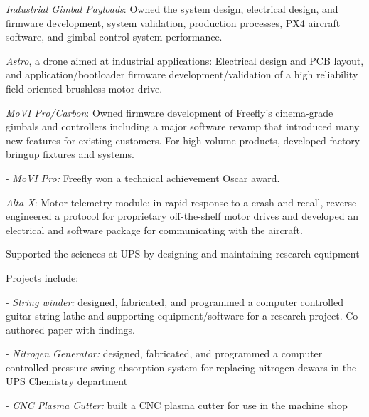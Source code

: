 \documentclass[letterpaper]{deedy-resume} %
\begin{document}
\begin{minipage}[t]{0.66\textwidth}
\begin{tightitemize}
\item \textit{Industrial Gimbal Payloads}: Owned the system design, electrical design, and firmware development, system validation, production processes, PX4 aircraft software, and gimbal control system performance.

\item \textit{Astro}, a drone aimed at industrial applications: Electrical design and PCB layout, and application/bootloader firmware development/validation of a high reliability field-oriented brushless motor drive. 

\item \textit{MoVI Pro/Carbon}: Owned firmware development of Freefly's cinema-grade gimbals and controllers including a major software revamp that introduced many new features for existing customers.  For high-volume products, developed factory bringup fixtures and systems.  

- \textit{MoVI Pro:} Freefly won a technical achievement Oscar award.

\item \textit{Alta X}:  Motor telemetry module: in rapid response to a crash and recall, reverse-engineered a protocol for proprietary off-the-shelf motor drives and developed an electrical and software package for communicating with the aircraft.

\end{tightitemize}
\vspace{\topsep} %

\begin{tightitemize}
\item Supported the sciences at UPS by designing and maintaining research equipment
\item Projects include:

- \textit{String winder:} designed, fabricated, and programmed a computer controlled guitar string lathe and supporting equipment/software for a research project.  Co-authored paper with findings.

- \textit{Nitrogen Generator:} designed, fabricated, and programmed a computer controlled pressure-swing-absorption system for replacing nitrogen dewars in the UPS Chemistry department

- \textit{CNC Plasma Cutter:} built a CNC plasma cutter for use in the machine shop
\end{tightitemize}


\end{minipage}
\end{document}
